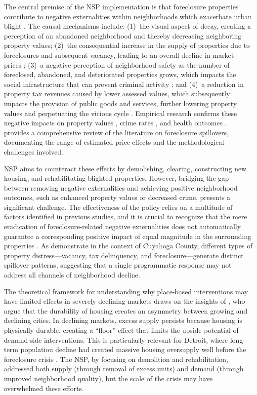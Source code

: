 \documentclass[12pt,authoryear]{elsarticle}
\begin{document}
The central premise of the NSP implementation is that foreclosure properties contribute to negative externalities within neighborhoods which exacerbate urban blight \citep{spader2015}. The causal mechanisms include: (1)~the visual aspect of decay, creating a perception of an abandoned neighborhood and thereby decreasing neighboring property values; (2)~the consequential increase in the supply of properties due to foreclosures and subsequent vacancy, leading to an overall decline in market prices \citep{schuetz2015}; (3)~a negative perception of neighborhood safety as the number of foreclosed, abandoned, and deteriorated properties grows, which impacts the social infrastructure that can prevent criminal activity \citep{spader2016}; and (4)~a reduction in property tax revenues caused by lower assessed values, which subsequently impacts the provision of public goods and services, further lowering property values and perpetuating the vicious cycle \citep{johnson2008}. Empirical research confirms these negative impacts on property values \citep{lee2008,harding2009,campbell2011,anenberg2014,hartley2014,gerardi2015,zhang2014}, crime rates \citep{spelman1993,ellen2013,kondo2018,stacy2018,larson2019}, and health outcomes \citep{leon2017,wangimmergluck2018,pearson2019}. \citet{frame2010} provides a comprehensive review of the literature on foreclosure spillovers, documenting the range of estimated price effects and the methodological challenges involved.

NSP aims to counteract these effects by demolishing, clearing, constructing new housing, and rehabilitating blighted properties. However, bridging the gap between removing negative externalities and achieving positive neighborhood outcomes, such as enhanced property values or decreased crime, presents a significant challenge. The effectiveness of the policy relies on a multitude of factors identified in previous studies, and it is crucial to recognize that the mere eradication of foreclosure-related negative externalities does not automatically guarantee a corresponding positive impact of equal magnitude in the surrounding properties \citep{alvayay2023}. As \citet{whitaker2013} demonstrate in the context of Cuyahoga County, different types of property distress---vacancy, tax delinquency, and foreclosure---generate distinct spillover patterns, suggesting that a single programmatic response may not address all channels of neighborhood decline.

The theoretical framework for understanding why place-based interventions may have limited effects in severely declining markets draws on the insights of \citet{glaeser2005}, who argue that the durability of housing creates an asymmetry between growing and declining cities. In declining markets, excess supply persists because housing is physically durable, creating a ``floor'' effect that limits the upside potential of demand-side interventions. This is particularly relevant for Detroit, where long-term population decline had created massive housing oversupply well before the foreclosure crisis \citep{alm2014}. The NSP, by focusing on demolition and rehabilitation, addressed both supply (through removal of excess units) and demand (through improved neighborhood quality), but the scale of the crisis may have overwhelmed these efforts.
\end{document}
